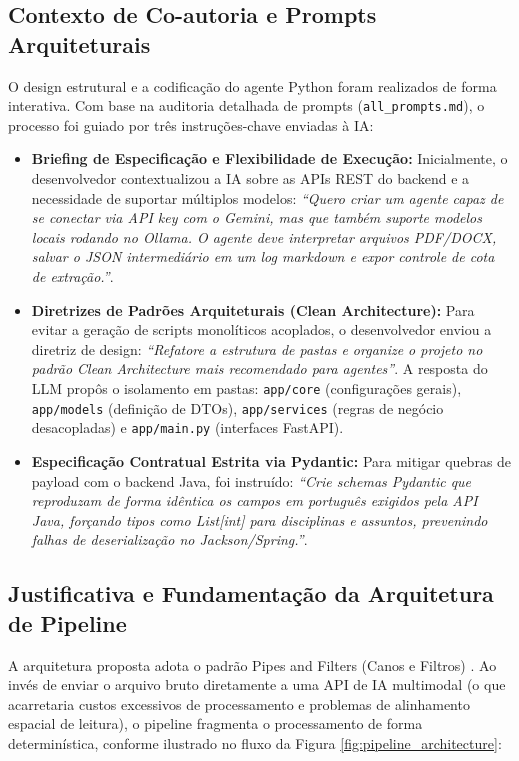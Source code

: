 \documentclass[sigconf]{acmart}
\begin{document}
\subsection{Contexto de Co-autoria e Prompts Arquiteturais}
O design estrutural e a codificação do agente Python foram realizados de forma interativa. Com base na auditoria detalhada de prompts (\lstinline{all_prompts.md}), o processo foi guiado por três instruções-chave enviadas à IA:
\begin{itemize}
\item \textbf{Briefing de Especificação e Flexibilidade de Execução:} Inicialmente, o desenvolvedor contextualizou a IA sobre as APIs REST do backend e a necessidade de suportar múltiplos modelos: \textit{``Quero criar um agente capaz de se conectar via API key com o Gemini, mas que também suporte modelos locais rodando no Ollama. O agente deve interpretar arquivos PDF/DOCX, salvar o JSON intermediário em um log markdown e expor controle de cota de extração.''}.
\item \textbf{Diretrizes de Padrões Arquiteturais (Clean Architecture):} Para evitar a geração de scripts monolíticos acoplados, o desenvolvedor enviou a diretriz de design: \textit{``Refatore a estrutura de pastas e organize o projeto no padrão Clean Architecture mais recomendado para agentes''}. A resposta do LLM propôs o isolamento em pastas: \lstinline{app/core} (configurações gerais), \lstinline{app/models} (definição de DTOs), \lstinline{app/services} (regras de negócio desacopladas) e \lstinline{app/main.py} (interfaces FastAPI).
\item \textbf{Especificação Contratual Estrita via Pydantic:} Para mitigar quebras de payload com o backend Java, foi instruído: \textit{``Crie schemas Pydantic que reproduzam de forma idêntica os campos em português exigidos pela API Java, forçando tipos como List[int] para disciplinas e assuntos, prevenindo falhas de deserialização no Jackson/Spring.''}.
\end{itemize}

\subsection{Justificativa e Fundamentação da Arquitetura de Pipeline}
A arquitetura proposta adota o padrão Pipes and Filters (Canos e Filtros) \cite{garlan1993introduction}. Ao invés de enviar o arquivo bruto diretamente a uma API de IA multimodal (o que acarretaria custos excessivos de processamento e problemas de alinhamento espacial de leitura), o pipeline fragmenta o processamento de forma determinística, conforme ilustrado no fluxo da Figura \ref{fig:pipeline_architecture}:
\end{document}

